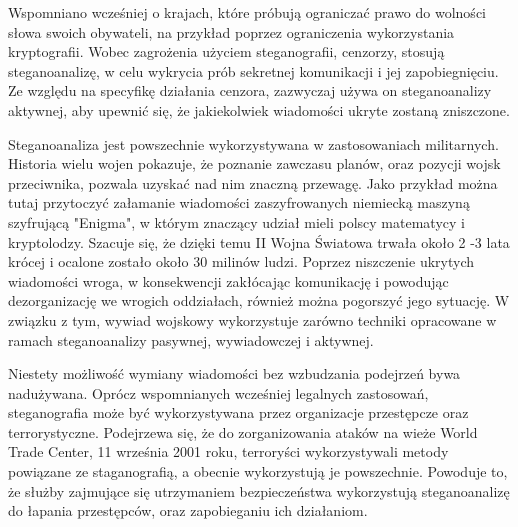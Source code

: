 \documentclass[a4paper, twoside, 12pt]{report}
\begin{document}
        Wspomniano wcześniej o krajach, które próbują ograniczać
        prawo do wolności słowa swoich obywateli, na przykład poprzez ograniczenia
        wykorzystania kryptografii. Wobec zagrożenia użyciem steganografii, cenzorzy,
        stosują steganoanalizę, w celu wykrycia prób sekretnej komunikacji i jej zapobiegnięciu.
        Ze względu na specyfikę działania cenzora, zazwyczaj używa on steganoanalizy
        aktywnej, aby upewnić się, że jakiekolwiek wiadomości ukryte zostaną zniszczone.

        Steganoanaliza jest powszechnie wykorzystywana w zastosowaniach militarnych.
        Historia wielu wojen pokazuje, że poznanie zawczasu planów, oraz pozycji
        wojsk przeciwnika, pozwala uzyskać nad nim znaczną przewagę. Jako przykład
        można tutaj przytoczyć załamanie wiadomości zaszyfrowanych niemiecką maszyną
        szyfrującą "Enigma", w którym znaczący udział mieli polscy matematycy i kryptolodzy.
        Szacuje się, że dzięki temu II Wojna Światowa trwała około 2 -3 lata krócej
        i ocalone zostało około 30 milinów ludzi. Poprzez niszczenie ukrytych wiadomości wroga,
        w konsekwencji zakłócając komunikację i powodując dezorganizację we wrogich oddziałach,
        również można pogorszyć jego sytuację.
        W związku z tym, wywiad wojskowy wykorzystuje zarówno techniki opracowane w
        ramach steganoanalizy pasywnej, wywiadowczej i aktywnej.

        Niestety możliwość wymiany wiadomości bez wzbudzania podejrzeń bywa nadużywana.
        Oprócz wspomnianych wcześniej legalnych zastosowań, steganografia może
        być wykorzystywana przez organizacje przestępcze oraz terrorystyczne. Podejrzewa
        się, że do zorganizowania ataków na wieże World Trade Center, 11 września 2001 roku,
        terroryści wykorzystywali metody powiązane ze staganografią, a obecnie wykorzystują
        je powszechnie\cite{TERRORISMANDSTEGANOGRAPHY}.
        Powoduje to, że służby zajmujące się utrzymaniem bezpieczeństwa wykorzystują
        steganoanalizę do łapania przestępców, oraz zapobieganiu ich działaniom.
\end{document}
